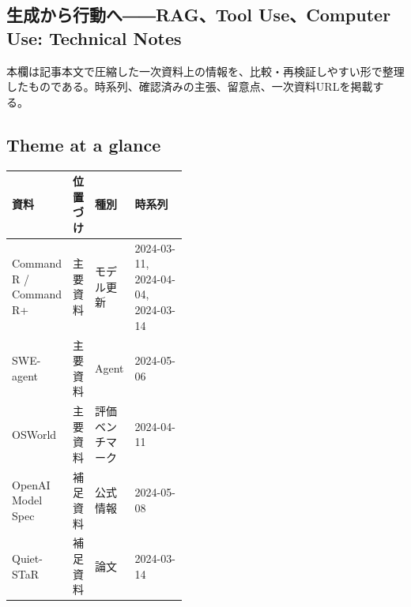 \subsection*{生成から行動へ――RAG、Tool Use、Computer Use: Technical Notes}
本欄は記事本文で圧縮した一次資料上の情報を、比較・再検証しやすい形で整理したものである。時系列、確認済みの主張、留意点、一次資料URLを掲載する。
\smallskip
{}\par
\medskip
\subsection*{Theme at a glance}
\begin{center}
\footnotesize
\begin{tabularx}{\linewidth}{@{}p{0.20\linewidth}p{0.10\linewidth}p{0.14\linewidth}X@{}}
\toprule
資料 & 位置づけ & 種別 & 時系列 \\
\midrule
Command R / Command R+ & 主要資料 & モデル更新 & 2024-03-11, 2024-04-04, 2024-03-14     \\
SWE-agent & 主要資料 & Agent & 2024-05-06     \\
OSWorld & 主要資料 & 評価ベンチマーク & 2024-04-11     \\
OpenAI Model Spec & 補足資料 & 公式情報 & 2024-05-08     \\
Quiet-STaR & 補足資料 & 論文 & 2024-03-14     \\
\bottomrule
\end{tabularx}
\end{center}
\normalsize

